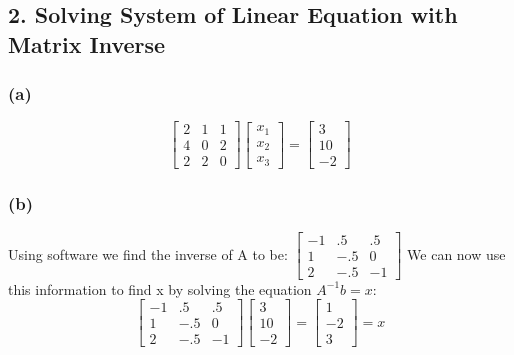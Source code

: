 \documentclass{article}
\begin{document}
\subsection*{2. Solving System of Linear Equation with Matrix Inverse}
\subsubsection*{(a)}

\begin{equation*}
  \begin{bmatrix}
    2 & 1 & 1\\
    4 & 0 & 2\\
    2 & 2 & 0
  \end{bmatrix}
  \begin{bmatrix}
    x_{1}\\
    x_{2}\\
    x_{3}
  \end{bmatrix}
  =
  \begin{bmatrix}
    3\\
    10\\
    -2
  \end{bmatrix}
\end{equation*}

\subsubsection*{(b)}
Using software we find the inverse of A to be: \(\begin{bmatrix}
  -1 & .5 & .5\\
  1 & -.5 & 0\\
  2 & -.5 & -1  
\end{bmatrix}\)
We can now use this information to find x by solving the equation $A^{-1}b = x$:
\begin{equation*}
  \begin{bmatrix}
    -1 & .5 & .5\\
    1 & -.5 & 0\\
    2 & -.5 & -1  
  \end{bmatrix}
  \begin{bmatrix}
    3\\
    10\\
    -2
  \end{bmatrix}
  =
  \begin{bmatrix}
    1\\
    -2\\
    3
  \end{bmatrix}
  = x
\end{equation*}
\end{document}
